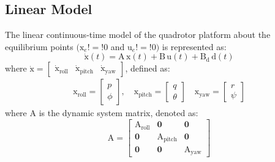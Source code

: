 \documentclass[3p,times]{elsarticle}
\begin{document}
\subsection{Linear Model}
\noindent The linear continuous-time model of the quadrotor platform about the equilibrium points $(\boldsymbol{{\mathrm{x}}}_e!=!0$ and $\boldsymbol{{\mathrm{u}}}_e!=!0)$ is represented as:
\begin{equation}\label{eq:linear}
	\boldsymbol{\dot{\mathrm{x}}}(t) = \boldsymbol{\mathrm{A\,x}}(t) + \boldsymbol{\mathrm{B\,u}}(t) + \boldsymbol{\mathrm{B_{d}\,d}}(t)
\end{equation}
where $\boldsymbol{\dot{\mathrm{x}}} = \begin{bmatrix}
				\boldsymbol{{\mathrm{\dot x_{\text{roll}}}}}&
				\boldsymbol{{\mathrm{\dot x_{\text{pitch}}}}}&
				\boldsymbol{{\mathrm{\dot x_{\text{yaw}}}}}
\end{bmatrix}$, defined as:
\begin{equation}
	\begin{split}
		\boldsymbol{\mathrm{x}}_{\text{roll}} = \begin{bmatrix}
			p \\ \phi
		\end{bmatrix}, \quad
		\boldsymbol{\mathrm{x}}_{\text{pitch}} = \begin{bmatrix}
			q \\ \theta \end{bmatrix} \quad
		\boldsymbol{\mathrm{x}}_{\text{yaw}} = 
		\begin{bmatrix}
			r \\ \psi
		\end{bmatrix}
	\end{split}
\end{equation}
where $\boldsymbol{\mathrm{A}}$ is the dynamic system matrix, denoted as:
\begin{equation}
	\boldsymbol{\mathrm{A}} = \begin{bmatrix}
		\boldsymbol{{\mathrm{A_{\text{roll}}}}} & \boldsymbol{0} & \boldsymbol{0}\\
		\boldsymbol{0} & \boldsymbol{{\mathrm{A_{\text{pitch}}}}} & \boldsymbol{0} \\
		\boldsymbol{0} & \boldsymbol{0} & \boldsymbol{{\mathrm{A_{\text{yaw}}}}}
	\end{bmatrix}
\end{equation}
\end{document}
